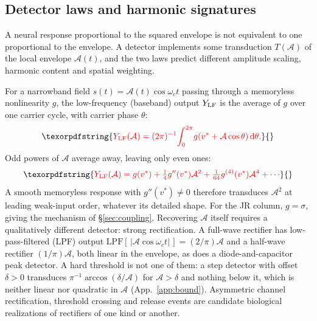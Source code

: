 \documentclass[11pt,a4paper]{article}
\newcommand{\Sig}{\sigma}
\providecommand{\DIFdeltex}[1]{{\protect\color{red} \scriptsize #1}} %
\providecommand{\DIFdel}[1]{\texorpdfstring{\DIFdeltex{#1}}{}} %
\begin{document}
\subsection{\DIFdel{Detector laws and harmonic signatures}}%
\addtocounter{subsection}{-1}%
\DIFdel{A neural response proportional to the squared envelope is not equivalent to one
proportional to the envelope. A detector implements some transduction $T(\mathcal A)$ of the local
envelope $\mathcal A(t)$, and the two laws predict different amplitude scaling, harmonic content and
spatial weighting.
}%

\DIFdel{For a narrowband field $s(t)=\mathcal A(t)\cos\omega_c t$ passing through a memoryless nonlinearity
$g$, the low-frequency (baseband) output $Y_{\rm LF}$ is the average of $g$ over one
carrier cycle, with carrier phase $\theta$:
}\[
\DIFdel{Y_{\rm LF}(\mathcal A)=(2\pi)^{-1}\!\int_0^{2\pi}\!g(v^*+\mathcal A\cos\theta)\,\mathrm{d}\theta.
}\]%
\DIFdel{Odd powers of $\mathcal A$ average away, leaving only even ones:
}\begin{displaymath}
\DIFdel{Y_{\rm LF}(\mathcal A)=g(v^*)+\tfrac14 g''(v^*)\mathcal A^2+\tfrac1{64}g^{(4)}(v^*)\mathcal A^4+\cdots
}\end{displaymath}%
\DIFdel{A smooth memoryless response with $g''(v^*)\neq0$ therefore transduces $\mathcal A^2$ at
leading weak-input order, whatever its detailed shape. For the JR column, $g=\Sig$, giving the
mechanism of \S\ref{sec:coupling}. Recovering $\mathcal A$ itself requires a qualitatively
different detector: strong rectification. A full-wave rectifier has low-pass-filtered (LPF) output
$\mathrm{LPF}[\,|\mathcal A\cos\omega_c t|\,]=(2/\pi)\mathcal A$ and a half-wave rectifier
$(1/\pi)\mathcal A$, both linear in the envelope, as does a diode-and-capacitor peak detector.
A hard threshold is not one of them: a step detector with offset $\delta>0$ transduces
$\pi^{-1}\arccos(\delta/\mathcal A)$ for $\mathcal A>\delta$ and nothing below it, which is neither linear
nor quadratic in $\mathcal A$ (App.~\ref{app:bound}). Asymmetric channel rectification, threshold
crossing and release events are candidate biological realizations of rectifiers of one
kind or another.
}%
\end{document}
